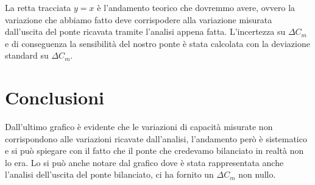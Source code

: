 \documentclass[12pt,]{article}
\begin{document}
La retta tracciata $y=x$ è l'andamento teorico che dovremmo avere, ovvero la variazione che abbiamo fatto deve corrispodere alla variazione misurata dall'uscita del ponte ricavata tramite l'analisi appena fatta. L'incertezza su $\Delta C_m$ e di conseguenza la sensibilità del nostro ponte è stata calcolata con la deviazione standard su $\Delta C_m$.
\section{Conclusioni}
Dall'ultimo grafico è evidente che le variazioni di capacità misurate non corrispondono alle variazioni ricavate dall'analisi, l'andamento però è sistematico e si può spiegare con il fatto che il ponte che credevamo bilanciato in realtà non lo era. Lo si può anche notare dal grafico dove è stata rappresentata anche l'analisi dell'uscita del ponte bilanciato, ci ha fornito un $\Delta C_m$ non nullo.
\end{document}
